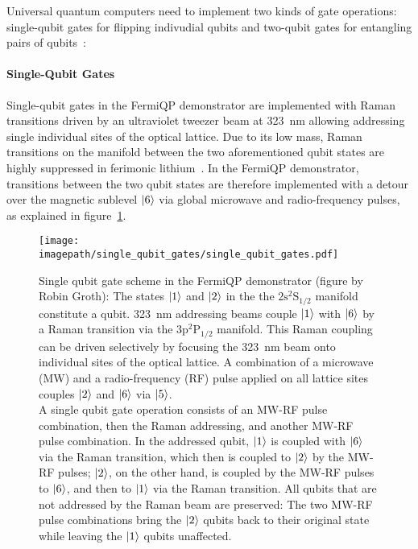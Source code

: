 Universal quantum computers need to implement two kinds of gate operations: single-qubit gates for flipping indivudial qubits and two-qubit gates for entangling pairs of qubits~\cite{hidary_quantum_2021, mainzer_quantencomputer_2020}:

\paragraph*{Single-Qubit Gates}
Single-qubit gates in the FermiQP demonstrator are implemented with Raman transitions driven by an ultraviolet tweezer beam at \SI[]{323}{\nano\meter} allowing addressing single individual sites of the optical lattice. Due to its low mass, Raman transitions on the manifold between the two aforementioned qubit states are highly suppressed in  ferimonic lithium~\cite{wei_magnetic-field_2013}. In the FermiQP demonstrator, transitions between the two qubit states are therefore implemented with a detour over the magnetic sublevel $\Ket{6}$ via global microwave and radio-frequency pulses, as explained in figure~\ref{fig:single_qubit_gates}.

\begin{figure}
    \centering
    \texttt{[image: \\imagepath/single\_qubit\_gates/single\_qubit\_gates.pdf]}
    \caption{Single qubit gate scheme in the FermiQP demonstrator (figure by Robin Groth): The states $\Ket{1}$ and $\Ket{2}$ in the the $2\text{s} ^2\text{S}_{1/2}$ manifold constitute a qubit.
    \SI[]{323}{\nano\meter} addressing beams couple $\Ket{1}$ with $\Ket{6}$ by a Raman transition via the $3\text{p} ^2\text{P}_{1/2}$ manifold. This Raman coupling can be driven selectively by focusing the \SI[]{323}{\nano\meter} beam onto individual sites of the optical lattice.
    A combination of a microwave (MW) and a radio-frequency (RF) pulse applied on all lattice sites couples $\Ket{2}$ and $\Ket{6}$ via $\Ket{5}$.\\
    A single qubit gate operation consists of an MW-RF pulse combination, then the Raman addressing, and another MW-RF pulse combination.
    In the addressed qubit, $\Ket{1}$ is coupled with $\Ket{6}$ via the Raman transition, which then is coupled to $\Ket{2}$ by the MW-RF pulses; $\Ket{2}$, on the other hand, is coupled by the MW-RF pulses to $\Ket{6}$, and then to $\Ket{1}$ via the Raman transition.
    All qubits that are not addressed by the Raman beam are preserved: The two MW-RF pulse combinations bring the $\Ket{2}$ qubits back to their original state while leaving the $\Ket{1}$ qubits unaffected.}
    \label{fig:single_qubit_gates}
\end{figure}

